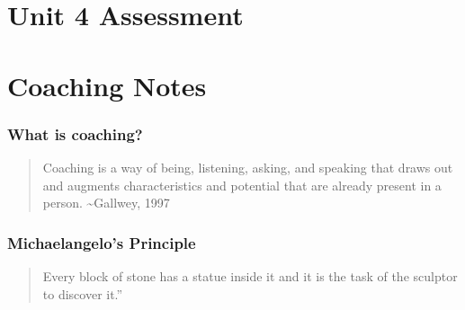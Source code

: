 \documentclass[
]{book}
\begin{document}
\hypertarget{unit-4-assessment}{%
\section*{Unit 4 Assessment}\label{unit-4-assessment}}

\hypertarget{coaching-notes}{%
\section*{Coaching Notes}\label{coaching-notes}}

\hypertarget{what-is-coaching}{%
\subsubsection*{\texorpdfstring{What is \textbf{coaching}?}{What is coaching?}}\label{what-is-coaching}}

\begin{quote}
Coaching is a way of being, listening, asking, and speaking that draws out and augments characteristics and potential that are already present in a person. \textasciitilde Gallwey, 1997
\end{quote}

\hypertarget{michaelangelos-principle}{%
\subsubsection*{Michaelangelo's Principle}\label{michaelangelos-principle}}

\begin{quote}
Every block of stone has a statue inside it and it is the task of the sculptor to discover it.''
\end{quote}
\end{document}
